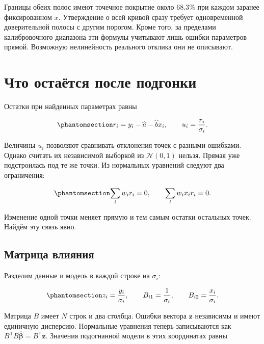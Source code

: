 \documentclass[
  russian,
  11pt,
  a4paper,
  open=any]{scrbook}
\begin{document}
Границы обеих полос имеют точечное покрытие около \(68.3\%\) при каждом
заранее фиксированном \(x\). Утверждение о всей кривой сразу требует
одновременной доверительной полосы с другим порогом. Кроме того, за
пределами калибровочного диапазона эти формулы учитывают лишь ошибки
параметров прямой. Возможную нелинейность реального отклика они не
описывают.

\section{Что остаётся после
подгонки}\label{ux447ux442ux43e-ux43eux441ux442ux430ux451ux442ux441ux44f-ux43fux43eux441ux43bux435-ux43fux43eux434ux433ux43eux43dux43aux438}

Остатки при найденных параметрах равны

\begin{equation}\protect\phantomsection\label{eq-ch11-fitted-residuals}{
r_i=y_i-\widehat a-\widehat bx_i,
\qquad
u_i=\frac{r_i}{\sigma_i}.
}\end{equation}

Величины \(u_i\) позволяют сравнивать отклонения точек с разными
ошибками. Однако считать их независимой выборкой из \(\mathcal N(0,1)\)
нельзя. Прямая уже подстроилась под те же точки. Из нормальных уравнений
следуют два ограничения:

\begin{equation}\protect\phantomsection\label{eq-ch11-residual-constraints}{
\sum_iw_i r_i=0,
\qquad
\sum_iw_ix_i r_i=0.
}\end{equation}

Изменение одной точки меняет прямую и тем самым остатки остальных точек.
Найдём эту связь явно.

\subsection{Матрица
влияния}\label{ux43cux430ux442ux440ux438ux446ux430-ux432ux43bux438ux44fux43dux438ux44f}

Разделим данные и модель в каждой строке на \(\sigma_i\):

\begin{equation}\protect\phantomsection\label{eq-ch11-standardized-design}{
z_i=\frac{y_i}{\sigma_i},
\qquad
B_{i1}=\frac1{\sigma_i},
\qquad
B_{i2}=\frac{x_i}{\sigma_i}.
}\end{equation}

Матрица \(B\) имеет \(N\) строк и два столбца. Ошибки вектора
\(\mathbf z\) независимы и имеют единичную дисперсию. Нормальные
уравнения теперь записываются как
\(B^{\mathsf T}B\widehat{\boldsymbol\beta}=B^{\mathsf T}\mathbf z\).
Значения подогнанной модели в этих координатах равны
\end{document}
